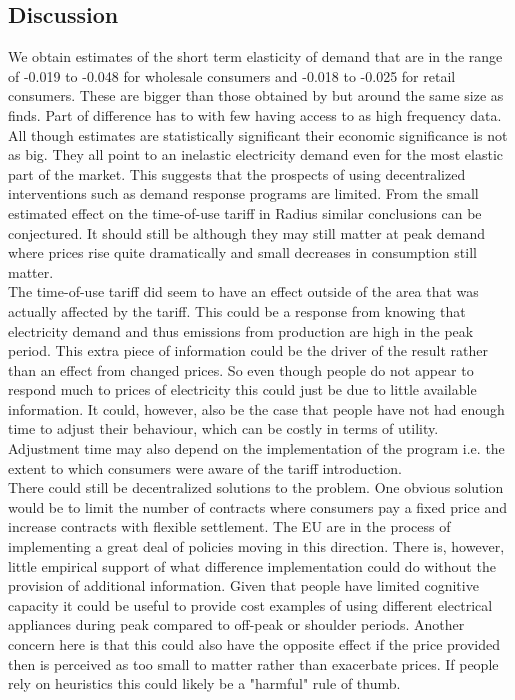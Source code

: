 \subsection{Discussion}
\label{subsec:r_discussion}
We obtain estimates of the short term elasticity of demand that are in the range of -0.019 to -0.048 for wholesale consumers and -0.018 to -0.025 for retail consumers. These are bigger than those obtained by \cite{lijesen2007real} but around the same size as \cite{wolak2001impact} finds. Part of difference has to with few having access to as high frequency data.  %
All though estimates are statistically significant their economic significance is not as big. They all point to an inelastic electricity demand even for the most elastic part of the market. This suggests that the prospects of using decentralized interventions such as demand response programs are limited. From the small estimated effect on the time-of-use tariff in Radius similar conclusions can be conjectured. It should still be although they may still matter at peak demand where prices rise quite dramatically and small decreases in consumption still matter.
\smallskip \\

The time-of-use tariff did seem to have an effect outside of the area that was actually affected by the tariff. This could be a response from knowing that electricity demand and thus emissions from production are high in the peak period. This extra piece of information could be the driver of the result rather than an effect from changed prices. So even though people do not appear to respond much to prices of electricity this could just be due to little available information. It could, however, also be the case that people have not had enough time to adjust their behaviour, which can be costly in terms of utility. Adjustment time may also depend on the implementation of the program i.e. the extent to which consumers were aware of the tariff introduction.
\smallskip \\

There could still be decentralized solutions to the problem. One obvious solution would be to limit the number of contracts where consumers pay a fixed price and increase contracts with flexible settlement. The EU are in the process of implementing a great deal of policies moving in this direction. There is, however, little empirical support of what difference implementation could do without the provision of additional information. Given that people have limited cognitive capacity it could be useful to provide cost examples of using different electrical appliances during peak compared to off-peak or shoulder periods.
Another concern here is that this could also have the opposite effect if the price provided then is perceived as too small to matter rather than exacerbate prices. If people rely on heuristics this could likely be a "harmful" rule of thumb.
\smallskip \\

